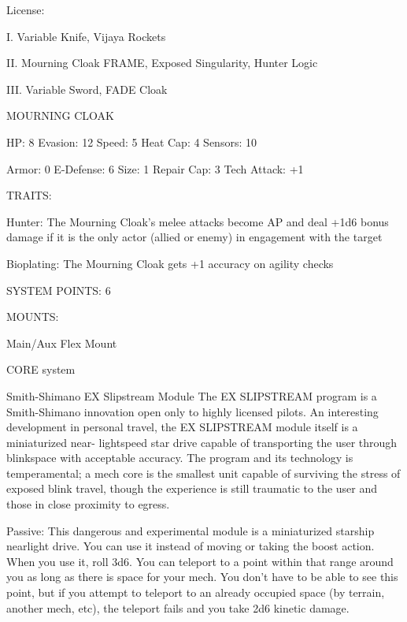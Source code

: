                                                   License:
 
I. Variable Knife, Vijaya Rockets
 
II. Mourning Cloak FRAME, Exposed Singularity, Hunter Logic
 
III. Variable Sword, FADE Cloak
 

                                           MOURNING CLOAK 

  HP: 8          Evasion: 12                          Speed: 5           Heat Cap: 4        Sensors: 10 

  Armor: 0       E-Defense: 6                         Size: 1            Repair Cap: 3      Tech Attack:  
                                                                                            +1 

                                                   TRAITS: 

  Hunter: The Mourning Cloak’s melee attacks become AP and deal +1d6 bonus damage if it is the only  
  actor (allied or enemy) in engagement with the target
 
  Bioplating: The Mourning Cloak gets +1 accuracy on agility checks 

                                             SYSTEM POINTS: 6 

                                                  MOUNTS: 

  Main/Aux                                             Flex Mount 

                                                CORE system 

                                                                                                           


                                     Smith-Shimano EX Slipstream Module  
   The EX SLIPSTREAM program is a Smith-Shimano innovation open only to highly licensed pilots. An  
  interesting development in personal travel, the EX SLIPSTREAM module itself is a miniaturized near- 
  lightspeed star drive capable of transporting the user through blinkspace with acceptable accuracy. The  
  program and its technology is temperamental; a mech core is the smallest unit capable of surviving the  
  stress of exposed blink travel, though the experience is still traumatic to the user and those in close  
  proximity to egress.    

   Passive:  
  This dangerous and experimental module is a miniaturized starship nearlight drive. You can use it  
   instead of moving or taking the boost action. When you use it, roll 3d6. You can teleport to a point  
  within that range around you as long as there is space for your mech. You don’t have to be able to see  
  this point, but if you attempt to teleport to an already occupied space (by terrain, another mech, etc),  
  the teleport fails and you take 2d6 kinetic damage.
 

